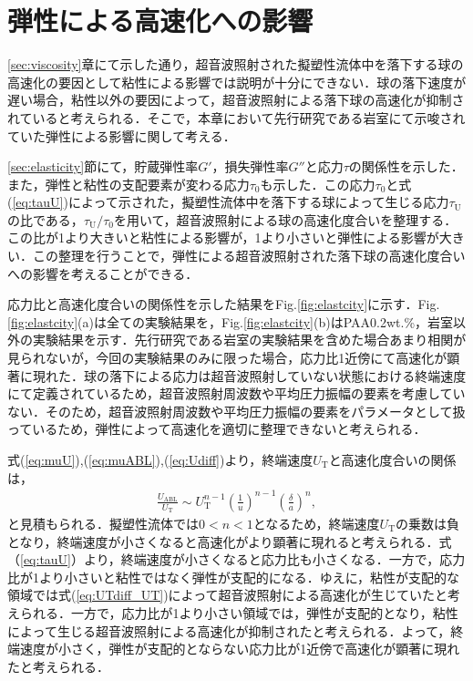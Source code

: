 \section{弾性による高速化への影響}
\label{sec:elasticity-discussion}

\ref{sec:viscosity}章にて示した通り，超音波照射された擬塑性流体中を落下する球の高速化の要因として粘性による影響では説明が十分にできない．球の落下速度が遅い場合，粘性以外の要因によって，超音波照射による落下球の高速化が抑制されていると考えられる．そこで，本章において先行研究である岩室\cite{ref:8}にて示唆されていた弾性による影響に関して考える．

\ref{sec:elasticity}節にて，貯蔵弾性率$G'$，損失弾性率$G''$と応力$\tau$の関係性を示した．また，弾性と粘性の支配要素が変わる応力$\tau_\text{0}$も示した．この応力$\tau_\text{0}$と式(\ref{eq:tauU})によって示された，擬塑性流体中を落下する球によって生じる応力$\tau_\text{U}$の比である，$\tau_\text{U}/\tau_\text{0}$を用いて，超音波照射による球の高速化度合いを整理する．この比が1より大きいと粘性による影響が，1より小さいと弾性による影響が大きい．この整理を行うことで，弾性による超音波照射された落下球の高速化度合いへの影響を考えることができる．

応力比と高速化度合いの関係性を示した結果をFig.\ref{fig:elastcity}に示す．Fig.\ref{fig:elastcity}(a)は全ての実験結果を，Fig.\ref{fig:elastcity}(b)はPAA0.2wt.\%，岩室\cite{ref:8}以外の実験結果を示す．先行研究である岩室\cite{ref:8}の実験結果を含めた場合あまり相関が見られないが，今回の実験結果のみに限った場合，応力比1近傍にて高速化が顕著に現れた．球の落下による応力は超音波照射していない状態における終端速度にて定義されているため，超音波照射周波数や平均圧力振幅の要素を考慮していない．そのため，超音波照射周波数や平均圧力振幅の要素をパラメータとして扱っているため，弾性によって高速化を適切に整理できないと考えられる．

式(\ref{eq:muU}),(\ref{eq:muABL}),(\ref{eq:Udiff})より，終端速度$U_\text{T}$と高速化度合いの関係は，
\begin{eqnarray}
    \frac{U_\text{ABL}}{U_\text{T}} \sim U_\text{T}^{n-1} \left(\frac{1}{u}\right)^{n-1} \left(\frac{\delta}{a}\right)^n ,
    \label{eq:UTdiff_UT}
\end{eqnarray}
と見積もられる．擬塑性流体では$0<n<1$となるため，終端速度$U_\text{T}$の乗数は負となり，終端速度が小さくなると高速化がより顕著に現れると考えられる．式（\ref{eq:tauU}）より，終端速度が小さくなると応力比も小さくなる．一方で，応力比が1より小さいと粘性ではなく弾性が支配的になる．ゆえに，粘性が支配的な領域では式(\ref{eq:UTdiff_UT})によって超音波照射による高速化が生じていたと考えられる．一方で，応力比が1より小さい領域では，弾性が支配的となり，粘性によって生じる超音波照射による高速化が抑制されたと考えられる．よって，終端速度が小さく，弾性が支配的とならない応力比が1近傍で高速化が顕著に現れたと考えられる．

